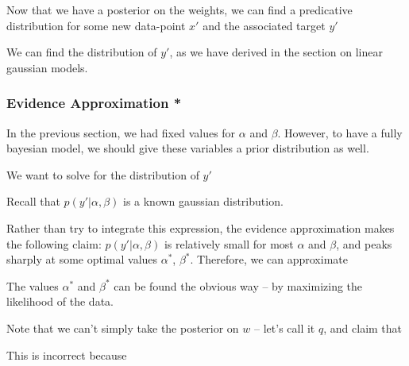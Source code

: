 \documentclass[12pt]{article}
\begin{document}
Now that we have a posterior on the weights, we can find a predicative distribution for some new data-point $x'$ and the associated target $y'$


We can find the distribution of $y'$, as we have derived in the section on linear gaussian models.


\subsubsection{Evidence Approximation *}

In the previous section, we had fixed values for $\alpha$ and $\beta$. However, to have a fully bayesian model, we should give these variables a prior distribution as well.


We want to solve for the distribution of $y'$


Recall that $p(y'|\alpha, \beta)$ is a known gaussian distribution.

Rather than try to integrate this expression, the evidence approximation makes the following claim: $p(y'|\alpha, \beta)$ is relatively small for most $\alpha$ and $\beta$, and peaks sharply at some optimal values $\alpha^*$, $\beta^*$. Therefore, we can approximate


The values $\alpha^*$ and $\beta^*$ can be found the obvious way -- by maximizing the likelihood of the data.


Note that we can't simply take the posterior on $w$ -- let's call it $q$, and claim that


This is incorrect because
\end{document}
